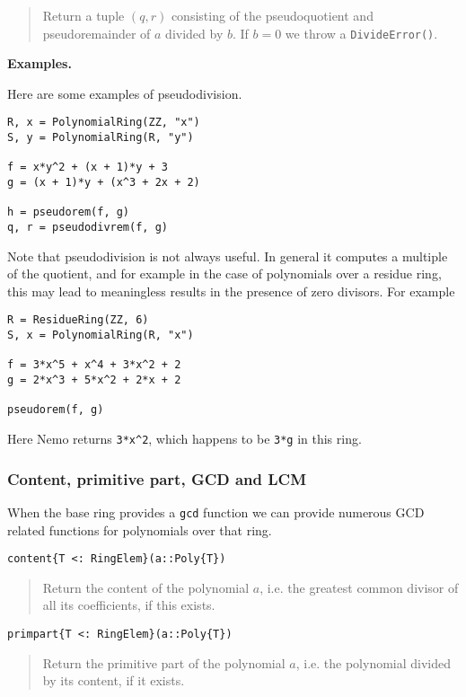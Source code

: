 \documentclass[a4paper,10pt]{article}
\newcommand{\code}{\lstinline}
\newcommand{\desc}[1]{\vspace{-3mm}\begin{quote}#1\end{quote}}
\begin{document}
\desc{Return a tuple $(q, r)$ consisting of the pseudoquotient and pseudoremainder 
of $a$ divided by $b$. If $b = 0$ we throw a \code{DivideError()}.}

\textbf{Examples.}

Here are some examples of pseudodivision.

\begin{lstlisting}
R, x = PolynomialRing(ZZ, "x")
S, y = PolynomialRing(R, "y")

f = x*y^2 + (x + 1)*y + 3
g = (x + 1)*y + (x^3 + 2x + 2)

h = pseudorem(f, g)
q, r = pseudodivrem(f, g)
\end{lstlisting}

Note that pseudodivision is not always useful. In general it computes a
multiple of the quotient, and for example in the case of polynomials over a
residue ring, this may lead to meaningless results in the presence of zero
divisors. For example

\begin{lstlisting}
R = ResidueRing(ZZ, 6)
S, x = PolynomialRing(R, "x")

f = 3*x^5 + x^4 + 3*x^2 + 2
g = 2*x^3 + 5*x^2 + 2*x + 2

pseudorem(f, g)
\end{lstlisting}

Here Nemo returns \code{3*x^2}, which happens to be \code{3*g} in this
ring.

\subsubsection{Content, primitive part, GCD and LCM}

When the base ring provides a \code{gcd} function we can provide numerous
GCD related functions for polynomials over that ring.

\begin{lstlisting}
content{T <: RingElem}(a::Poly{T})
\end{lstlisting}

\desc{Return the content of the polynomial $a$, i.e. the greatest common divisor
of all its coefficients, if this exists.}

\begin{lstlisting}
primpart{T <: RingElem}(a::Poly{T})
\end{lstlisting}

\desc{Return the primitive part of the polynomial $a$, i.e. the polynomial
divided by its content, if it exists.}
\end{document}
